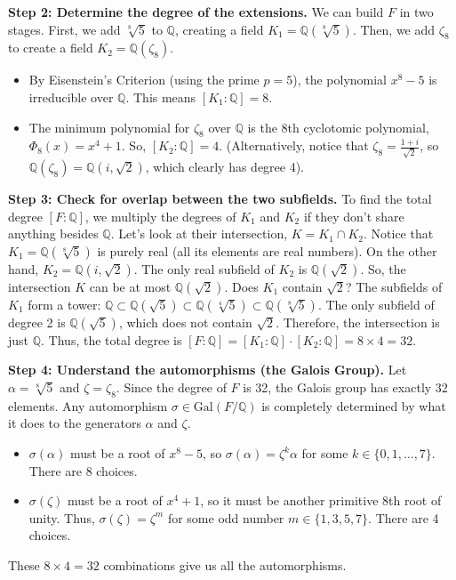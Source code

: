 \begin{solution}
\textbf{Step 2: Determine the degree of the extensions.}
We can build $F$ in two stages. First, we add $\sqrt[8]{5}$ to $\mathbb{Q}$, creating a field $K_1 = \mathbb{Q}(\sqrt[8]{5})$. Then, we add $\zeta_8$ to create a field $K_2 = \mathbb{Q}(\zeta_8)$.
\begin{itemize}
    \item By Eisenstein's Criterion (using the prime $p=5$), the polynomial $x^8 - 5$ is irreducible over $\mathbb{Q}$. This means $[K_1 : \mathbb{Q}] = 8$.
    \item The minimum polynomial for $\zeta_8$ over $\mathbb{Q}$ is the 8th cyclotomic polynomial, $\Phi_8(x) = x^4 + 1$. So, $[K_2 : \mathbb{Q}] = 4$. (Alternatively, notice that $\zeta_8 = \frac{1+i}{\sqrt{2}}$, so $\mathbb{Q}(\zeta_8) = \mathbb{Q}(i, \sqrt{2})$, which clearly has degree 4).
\end{itemize}

\textbf{Step 3: Check for overlap between the two subfields.}
To find the total degree $[F : \mathbb{Q}]$, we multiply the degrees of $K_1$ and $K_2$ if they don't share anything besides $\mathbb{Q}$. Let's look at their intersection, $K = K_1 \cap K_2$.
Notice that $K_1 = \mathbb{Q}(\sqrt[8]{5})$ is purely real (all its elements are real numbers). On the other hand, $K_2 = \mathbb{Q}(i, \sqrt{2})$. The only real subfield of $K_2$ is $\mathbb{Q}(\sqrt{2})$. So, the intersection $K$ can be at most $\mathbb{Q}(\sqrt{2})$.
Does $K_1$ contain $\sqrt{2}$? The subfields of $K_1$ form a tower: $\mathbb{Q} \subset \mathbb{Q}(\sqrt{5}) \subset \mathbb{Q}(\sqrt[4]{5}) \subset \mathbb{Q}(\sqrt[8]{5})$. The only subfield of degree 2 is $\mathbb{Q}(\sqrt{5})$, which does not contain $\sqrt{2}$.
Therefore, the intersection is just $\mathbb{Q}$.
Thus, the total degree is $[F : \mathbb{Q}] = [K_1 : \mathbb{Q}] \cdot [K_2 : \mathbb{Q}] = 8 \times 4 = 32$.

\textbf{Step 4: Understand the automorphisms (the Galois Group).}
Let $\alpha = \sqrt[8]{5}$ and $\zeta = \zeta_8$. Since the degree of $F$ is 32, the Galois group has exactly 32 elements. Any automorphism $\sigma \in \text{Gal}(F/\mathbb{Q})$ is completely determined by what it does to the generators $\alpha$ and $\zeta$.
\begin{itemize}
    \item $\sigma(\alpha)$ must be a root of $x^8 - 5$, so $\sigma(\alpha) = \zeta^k \alpha$ for some $k \in \{0, 1, \dots, 7\}$. There are 8 choices.
    \item $\sigma(\zeta)$ must be a root of $x^4 + 1$, so it must be another primitive 8th root of unity. Thus, $\sigma(\zeta) = \zeta^m$ for some odd number $m \in \{1, 3, 5, 7\}$. There are 4 choices.
\end{itemize}
These $8 \times 4 = 32$ combinations give us all the automorphisms.


\end{solution}
